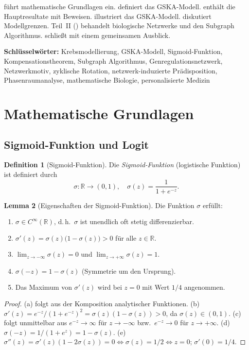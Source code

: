 ﻿\documentclass[12pt, a4paper]{article}
\theoremstyle{definition}
\newtheorem{definition}{Definition}[section]
\newtheorem{lemma}[definition]{Lemma}
\theoremstyle{remark}
\newcommand{\R}{\mathbb{R}}
\begin{document}
 führt mathematische Grundlagen ein.
 definiert das GSKA-Modell.
 enthält die Hauptresultate mit Beweisen.
 illustriert das GSKA-Modell.
 diskutiert Modellgrenzen.
Teil~II () behandelt biologische Netzwerke und den Subgraph Algorithmus.
 schließt mit einem gemeinsamen Ausblick.

\textbf{Schlüsselwörter:}
  Krebsmodellierung, GSKA-Modell, Sigmoid-Funktion, Kompensationstheorem,
  Subgraph Algorithmus, Genregulationsnetzwerk, Netzwerkmotiv, zyklische
  Rotation, netzwerk-induzierte Prädisposition, Phasenraumanalyse,
  mathematische Biologie, personalisierte Medizin

\section{Mathematische Grundlagen}
\label{sec:grundlagen}


\subsection{Sigmoid-Funktion und Logit}

\begin{definition}[Sigmoid-Funktion]
\label{def:sigmoid}
Die \emph{Sigmoid-Funktion} (logistische Funktion) ist definiert durch
\[
  \sigma : \R \to (0,1), \quad \sigma(z) = \frac{1}{1 + e^{-z}}.
\]
\end{definition}

\begin{lemma}[Eigenschaften der Sigmoid-Funktion]
\label{lem:sigmoid_props}
Die Funktion $\sigma$ erfüllt:
\begin{enumerate}[label=(\alph*)]
  \item $\sigma \in C^\infty(\R)$, d.\,h.\ $\sigma$ ist unendlich oft stetig differenzierbar.
  \item $\sigma'(z) = \sigma(z)\bigl(1-\sigma(z)\bigr) > 0$ für alle $z \in \R$.
  \item $\lim_{z \to -\infty}\sigma(z) = 0$ und $\lim_{z \to +\infty}\sigma(z) = 1$.
  \item $\sigma(-z) = 1 - \sigma(z)$ (Symmetrie um den Ursprung).
  \item Das Maximum von $\sigma'(z)$ wird bei $z=0$ mit Wert $1/4$ angenommen.
\end{enumerate}
\end{lemma}

\begin{proof}
(a) folgt aus der Komposition analytischer Funktionen.
(b) $\sigma'(z) = e^{-z}/(1+e^{-z})^2 = \sigma(z)(1-\sigma(z)) > 0$, da
$\sigma(z) \in (0,1)$.
(c) folgt unmittelbar aus $e^{-z} \to \infty$ für $z \to -\infty$ bzw.\
$e^{-z} \to 0$ für $z \to +\infty$.
(d) $\sigma(-z) = 1/(1+e^z) = 1 - \sigma(z)$.
(e) $\sigma''(z) = \sigma'(z)(1-2\sigma(z)) = 0 \iff \sigma(z)=1/2 \iff z=0$;
$\sigma'(0) = 1/4$.
\end{proof}
\end{document}
